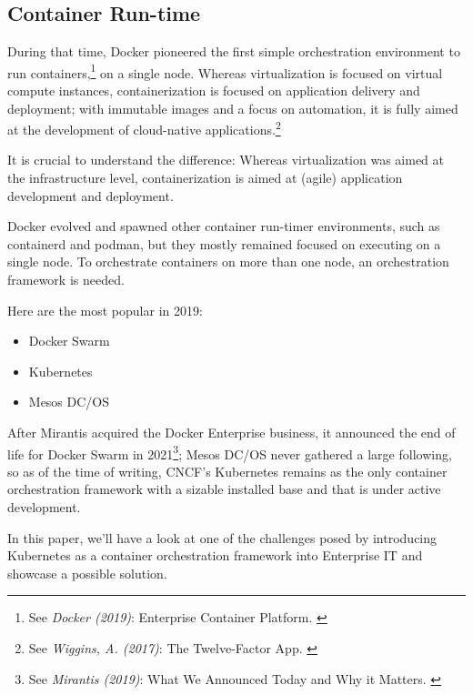 \subsection{Container Run-time}

During that time, Docker pioneered the first simple orchestration environment to run containers,\footnote{See \textit{Docker (2019)}: Enterprise Container Platform. \cite{docker}} on a single node. Whereas virtualization is focused on virtual compute instances, containerization is focused on application delivery and deployment; with immutable images and a focus on automation, it is fully aimed at the development of cloud-native applications.\footnote{See \textit{Wiggins, A. (2017)}: The Twelve-Factor App. \cite{12factor}}

It is crucial to understand the difference: Whereas virtualization was aimed at the infrastructure level, containerization is aimed at (agile) application development and deployment.

Docker evolved and spawned other container run-timer environments, such as containerd and podman, but they mostly remained focused on executing on a single node. To orchestrate containers on more than one node, an orchestration framework is needed. 

Here are the most popular in 2019:
\begin{itemize}
\item Docker Swarm
\item Kubernetes
\item Mesos DC/OS
\end{itemize}

After Mirantis acquired the Docker Enterprise business, it announced the end of life for Docker Swarm in 2021\footnote{See \textit{Mirantis (2019)}: What We Announced Today and Why it Matters. \cite{mirantisDocker}}; Mesos DC/OS never gathered a large following, so as of the time of writing, CNCF's Kubernetes remains as the only container orchestration framework with a sizable installed base and that is under active development.

In this paper, we'll have a look at one of the challenges posed by introducing Kubernetes as a container orchestration framework into Enterprise IT and showcase a possible solution.
